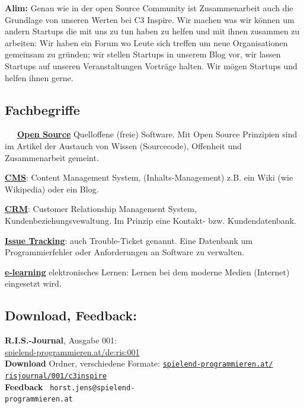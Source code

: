 \textbf{Alim:} Genau wie in der open Source Community ist Zusammenarbeit auch 
die Grundlage von unseren Werten bei C3 Inspire. Wir machen was wir 
können um andern Startups die mit uns zu tun haben zu helfen und mit 
ihnen zusammen zu arbeiten: Wir haben ein Forum wo Leute sich treffen 
um neue Organisationen gemeinsam zu gründen; wir stellen Startups in 
unserem Blog vor,  wir lassen Startups auf unseren Veranstaltungen 
Vorträge halten. Wir mögen Startups und helfen ihnen gerne.


\subsection*{Fachbegriffe}
~~~\href{https://de.wikipedia.org/wiki/Portal:Freie_Software}{\textbf{Open Source}} Quelloffene (freie) Software. Mit Open Source Prinzipien sind im Artikel der Austauch von Wissen (Sourcecode), Offenheit und Zusammenarbeit gemeint. 

\href{https://de.wikipedia.org/wiki/Content-Management-System}{\textbf{CMS}}: Content Management System, (Inhalts-Management) z.B. ein Wiki (wie Wikipedia) oder ein Blog. 

\href{https://de.wikipedia.org/wiki/Customer-Relationship-Management}{\textbf{CRM}}: Customer Relationship Management System, Kundenbeziehungsvewaltung. Im Prinzip eine Kontakt- bzw. Kundendatenbank.

\href{https://de.wikipedia.org/wiki/Issue-Tracking-System}{\textbf{Issue Tracking}}: auch Trouble-Ticket genannt. Eine Datenbank um Programmierfehler oder Anforderungen an Software zu verwalten. 

\href{https://de.wikipedia.org/wiki/ELearning}{\textbf{e-learning}} elektronisches Lernen: Lernen bei dem moderne Medien (Internet) eingesetzt wird.

\subsection*{Download, Feedback:}
\textbf{R.I.S.-Journal}, Ausgabe 001: \\
\href{http://spielend-programmieren.at/de:ris:001}{spielend-programmieren.at/de:ris:001}\\
\textbf{Download} Ordner, verschiedene Formate: \href{http://spielend-programmieren.at/risjournal/001/c3inspire}{\texttt{spielend-programmieren.at/\\risjournal/001/c3inspire}} \\
\textbf{Feedback} \Letter\ \texttt{horst.jens@spielend-\\programmieren.at} \\


